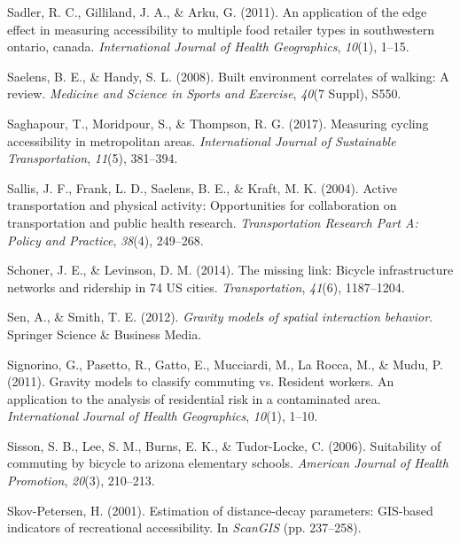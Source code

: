 \documentclass[
11pt, %
oneside, %
english, %
singlespacing, %
]{macthesis} %
\newlength{\cslhangindent}
\newenvironment{CSLReferences}[2] %
{\begin{list}{}{%
	\setlength{\itemindent}{0pt}
	\setlength{\leftmargin}{0pt}
	\setlength{\parsep}{0pt}
	\ifodd #1
	\setlength{\leftmargin}{\cslhangindent}
	\setlength{\itemindent}{-1\cslhangindent}
	\fi
	\setlength{\itemsep}{#2\baselineskip}}}
{\end{list}}
\begin{document}
\begin{CSLReferences}{1}{0}
Sadler, R. C., Gilliland, J. A., \& Arku, G. (2011). An application of the edge effect in measuring accessibility to multiple food retailer types in southwestern ontario, canada. \emph{International Journal of Health Geographics}, \emph{10}(1), 1--15.

Saelens, B. E., \& Handy, S. L. (2008). Built environment correlates of walking: A review. \emph{Medicine and Science in Sports and Exercise}, \emph{40}(7 Suppl), S550.

Saghapour, T., Moridpour, S., \& Thompson, R. G. (2017). Measuring cycling accessibility in metropolitan areas. \emph{International Journal of Sustainable Transportation}, \emph{11}(5), 381--394.

Sallis, J. F., Frank, L. D., Saelens, B. E., \& Kraft, M. K. (2004). Active transportation and physical activity: Opportunities for collaboration on transportation and public health research. \emph{Transportation Research Part A: Policy and Practice}, \emph{38}(4), 249--268.

Schoner, J. E., \& Levinson, D. M. (2014). The missing link: Bicycle infrastructure networks and ridership in 74 US cities. \emph{Transportation}, \emph{41}(6), 1187--1204.

Sen, A., \& Smith, T. E. (2012). \emph{Gravity models of spatial interaction behavior}. Springer Science \& Business Media.

Signorino, G., Pasetto, R., Gatto, E., Mucciardi, M., La Rocca, M., \& Mudu, P. (2011). Gravity models to classify commuting vs. Resident workers. An application to the analysis of residential risk in a contaminated area. \emph{International Journal of Health Geographics}, \emph{10}(1), 1--10.

Sisson, S. B., Lee, S. M., Burns, E. K., \& Tudor-Locke, C. (2006). Suitability of commuting by bicycle to arizona elementary schools. \emph{American Journal of Health Promotion}, \emph{20}(3), 210--213.

Skov-Petersen, H. (2001). Estimation of distance-decay parameters: GIS-based indicators of recreational accessibility. In \emph{ScanGIS} (pp. 237--258).


\end{CSLReferences}
\end{document}
